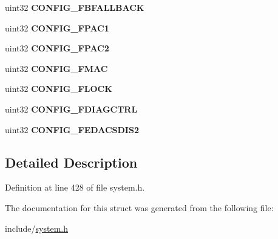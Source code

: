 \begin{DoxyCompactItemize}
uint32 {\bfseries C\+O\+N\+F\+I\+G\+\_\+\+F\+B\+F\+A\+L\+L\+B\+A\+CK}
\item 
\mbox{\label{structtcmflash__config__reg_a0f0b4a36c352f5b895fd9068e4e3cf14}} 
uint32 {\bfseries C\+O\+N\+F\+I\+G\+\_\+\+F\+P\+A\+C1}
\item 
\mbox{\label{structtcmflash__config__reg_a768b583adac08be27f6bbd07e342d6ae}} 
uint32 {\bfseries C\+O\+N\+F\+I\+G\+\_\+\+F\+P\+A\+C2}
\item 
\mbox{\label{structtcmflash__config__reg_aa1d619a6f678bc69eaab88189e7cdf3f}} 
uint32 {\bfseries C\+O\+N\+F\+I\+G\+\_\+\+F\+M\+AC}
\item 
\mbox{\label{structtcmflash__config__reg_a704eb0435ed5bbcd8c8f4f91e8cef006}} 
uint32 {\bfseries C\+O\+N\+F\+I\+G\+\_\+\+F\+L\+O\+CK}
\item 
\mbox{\label{structtcmflash__config__reg_a09c977c66e3ece4381a6f832087fac72}} 
uint32 {\bfseries C\+O\+N\+F\+I\+G\+\_\+\+F\+D\+I\+A\+G\+C\+T\+RL}
\item 
\mbox{\label{structtcmflash__config__reg_a023febbd12e242ada9e91451a359ccaf}} 
uint32 {\bfseries C\+O\+N\+F\+I\+G\+\_\+\+F\+E\+D\+A\+C\+S\+D\+I\+S2}
\end{DoxyCompactItemize}


\subsection{Detailed Description}


Definition at line 428 of file system.\+h.



The documentation for this struct was generated from the following file\+:\begin{DoxyCompactItemize}
\item 
include/\mbox{\hyperlink{system_8h}{system.\+h}}\end{DoxyCompactItemize}
